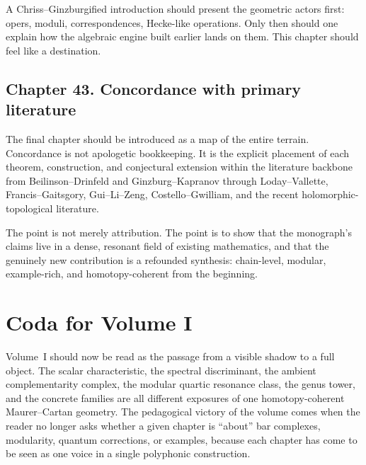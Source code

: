 A Chriss--Ginzburgified introduction should present the geometric actors first: opers, moduli, correspondences, Hecke-like operations.  Only then should one explain how the algebraic engine built earlier lands on them.  This chapter should feel like a destination.

\subsection*{Chapter 43. Concordance with primary literature}
The final chapter should be introduced as a map of the entire terrain.  Concordance is not apologetic bookkeeping.  It is the explicit placement of each theorem, construction, and conjectural extension within the literature backbone from Beilinson--Drinfeld and Ginzburg--Kapranov through Loday--Vallette, Francis--Gaitsgory, Gui--Li--Zeng, Costello--Gwilliam, and the recent holomorphic-topological literature.

The point is not merely attribution.  The point is to show that the monograph's claims live in a dense, resonant field of existing mathematics, and that the genuinely new contribution is a refounded synthesis: chain-level, modular, example-rich, and homotopy-coherent from the beginning.

\section*{Coda for Volume I}
Volume~I should now be read as the passage from a visible shadow to a full object.  The scalar characteristic, the spectral discriminant, the ambient complementarity complex, the modular quartic resonance class, the genus tower, and the concrete families are all different exposures of one homotopy-coherent Maurer--Cartan geometry.  The pedagogical victory of the volume comes when the reader no longer asks whether a given chapter is ``about'' bar complexes, modularity, quantum corrections, or examples, because each chapter has come to be seen as one voice in a single polyphonic construction.
